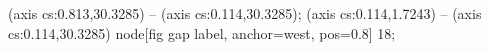  (axis cs:0.813,30.3285) -- (axis cs:0.114,30.3285);
 (axis cs:0.114,1.7243) -- (axis cs:0.114,30.3285)
  node[fig gap label, anchor=west, pos=0.8] {\texttimes{}18};
